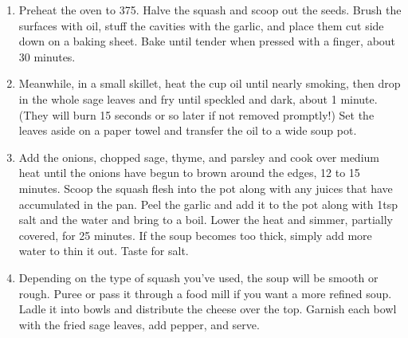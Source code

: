
\begin{ingredients}
\end{ingredients}


\begin{recipe}
  \begin{enumerate}

  \item Preheat the oven to 375\F.  Halve the squash and scoop out the
    seeds.  Brush the surfaces with oil, stuff the cavities with the
    garlic, and place them cut side down on a baking sheet.  Bake
    until tender when pressed with a finger, about 30 minutes.

  \item Meanwhile, in a small skillet, heat the \fracQ cup oil until
    nearly smoking, then drop in the whole sage leaves and fry until
    speckled and dark, about 1 minute.  (They will burn 15 seconds or
    so later if not removed promptly!)  Set the leaves aside on a
    paper towel and transfer the oil to a wide soup pot.

  \item Add the onions, chopped sage, thyme, and parsley and cook over
    medium heat until the onions have begun to brown around the edges,
    12 to 15 minutes.  Scoop the squash flesh into the pot along with
    any juices that have accumulated in the pan.  Peel the garlic and
    add it to the pot along with 1\fracH tsp salt and the water and
    bring to a boil.  Lower the heat and simmer, partially covered,
    for 25 minutes.  If the soup becomes too thick, simply add more
    water to thin it out.  Taste for salt.

  \item Depending on the type of squash you've used, the soup will be
    smooth or rough.  Puree or pass it through a food mill if you want
    a more refined soup.  Ladle it into bowls and distribute the
    cheese over the top.  Garnish each bowl with the fried sage
    leaves, add pepper, and serve.

  \end{enumerate}
\end{recipe}
